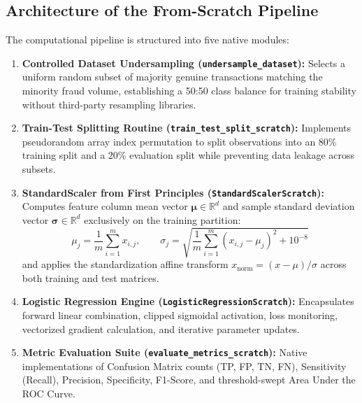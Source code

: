 \documentclass[11pt,a4paper]{article}
\begin{document}
\subsection{Architecture of the From-Scratch Pipeline}
The computational pipeline is structured into five native modules:
\begin{enumerate}
    \item \textbf{Controlled Dataset Undersampling (\texttt{undersample\_dataset}):} Selects a uniform random subset of majority genuine transactions matching the minority fraud volume, establishing a 50:50 class balance for training stability without third-party resampling libraries.
    \item \textbf{Train-Test Splitting Routine (\texttt{train\_test\_split\_scratch}):} Implements pseudorandom array index permutation to split observations into an $80\%$ training split and a $20\%$ evaluation split while preventing data leakage across subsets.
    \item \textbf{StandardScaler from First Principles (\texttt{StandardScalerScratch}):} Computes feature column mean vector $\boldsymbol{\mu} \in \mathbb{R}^d$ and sample standard deviation vector $\boldsymbol{\sigma} \in \mathbb{R}^d$ exclusively on the training partition:
    \begin{equation}
        \mu_j = \frac{1}{m} \sum_{i=1}^m x_{i,j}, \qquad \sigma_j = \sqrt{\frac{1}{m} \sum_{i=1}^m (x_{i,j} - \mu_j)^2 + 10^{-8}}
    \end{equation}
    and applies the standardization affine transform $x_{\text{norm}} = (x - \mu)/\sigma$ across both training and test matrices.
    \item \textbf{Logistic Regression Engine (\texttt{LogisticRegressionScratch}):} Encapsulates forward linear combination, clipped sigmoidal activation, loss monitoring, vectorized gradient calculation, and iterative parameter updates.
    \item \textbf{Metric Evaluation Suite (\texttt{evaluate\_metrics\_scratch}):} Native implementations of Confusion Matrix counts (TP, FP, TN, FN), Sensitivity (Recall), Precision, Specificity, F1-Score, and threshold-swept Area Under the ROC Curve.
\end{enumerate}
\end{document}
